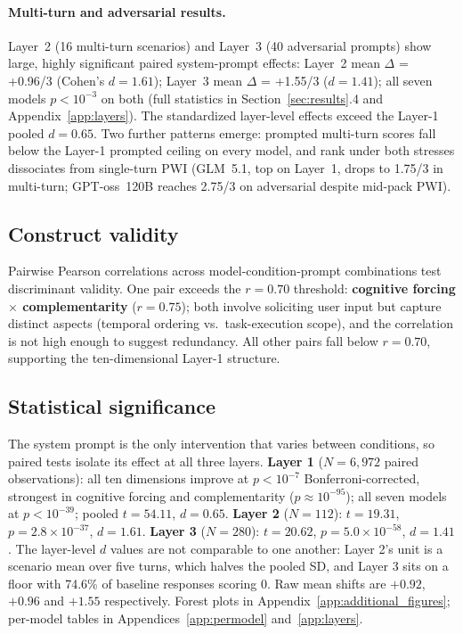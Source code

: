 \documentclass{article}
\begin{document}
\paragraph{Multi-turn and adversarial results.}
Layer~2 (16 multi-turn scenarios) and Layer~3 (40 adversarial prompts) show large, highly significant paired system-prompt effects: Layer~2 mean $\Delta$ = +0.96/3 (Cohen's $d = 1.61$); Layer~3 mean $\Delta$ = +1.55/3 ($d = 1.41$); all seven models $p < 10^{-3}$ on both (full statistics in Section~\ref{sec:results}.4 and Appendix~\ref{app:layers}). The standardized layer-level effects exceed the Layer-1 pooled $d = 0.65$. Two further patterns emerge: prompted multi-turn scores fall below the Layer-1 prompted ceiling on every model, and rank under both stresses dissociates from single-turn PWI (GLM~5.1, top on Layer~1, drops to 1.75/3 in multi-turn; GPT-oss~120B reaches 2.75/3 on adversarial despite mid-pack PWI).

\subsection{Construct validity}

Pairwise Pearson correlations across model-condition-prompt combinations test discriminant validity. One pair exceeds the $r = 0.70$ threshold: \textbf{cognitive forcing $\times$ complementarity} ($r = 0.75$); both involve soliciting user input but capture distinct aspects (temporal ordering vs.\ task-execution scope), and the correlation is not high enough to suggest redundancy. All other pairs fall below $r = 0.70$, supporting the ten-dimensional Layer-1 structure.

\subsection{Statistical significance}

The system prompt is the only intervention that varies between conditions, so paired tests isolate its effect at all three layers. \textbf{Layer 1} ($N = 6{,}972$ paired observations): all ten dimensions improve at $p < 10^{-7}$ Bonferroni-corrected, strongest in cognitive forcing and complementarity ($p \approx 10^{-95}$); all seven models at $p < 10^{-39}$; pooled $t = 54.11$, $d = 0.65$. \textbf{Layer 2} ($N = 112$): $t = 19.31$, $p = 2.8 \times 10^{-37}$, $d = 1.61$. \textbf{Layer 3} ($N = 280$): $t = 20.62$, $p = 5.0 \times 10^{-58}$, $d = 1.41$. The layer-level $d$ values are not comparable to one another: Layer 2's unit is a scenario mean over five turns, which halves the pooled SD, and Layer 3 sits on a floor with 74.6\% of baseline responses scoring 0. Raw mean shifts are $+0.92$, $+0.96$ and $+1.55$ respectively. Forest plots in Appendix~\ref{app:additional_figures}; per-model tables in Appendices~\ref{app:permodel} and~\ref{app:layers}.
\end{document}
